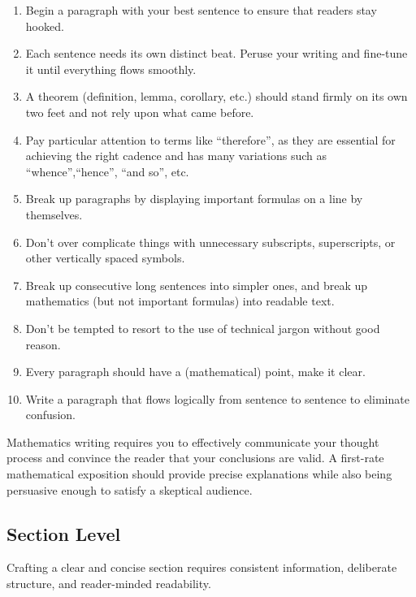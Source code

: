 \documentclass[
  twoside,
  12pt,
  letterpaper,
  fleqn]{article}
\providecommand{\tightlist}{%
  \setlength{\itemsep}{0pt}\setlength{\parskip}{0pt}}\usepackage{longtable,booktabs,array}
\begin{document}
\begin{enumerate}
\def\labelenumi{\arabic{enumi}.}
\tightlist
\item
  Begin a paragraph with your best sentence to ensure that readers stay
  hooked.
\item
  Each sentence needs its own distinct beat. Peruse your writing and
  fine-tune it until everything flows smoothly.
\item
  A theorem (definition, lemma, corollary, etc.) should stand firmly on
  its own two feet and not rely upon what came before.
\item
  Pay particular attention to terms like ``therefore'', as they are
  essential for achieving the right cadence and has many variations such
  as ``whence'',``hence'', ``and so'', etc.
\item
  Break up paragraphs by displaying important formulas on a line by
  themselves.
\item
  Don't over complicate things with unnecessary subscripts,
  superscripts, or other vertically spaced symbols.
\item
  Break up consecutive long sentences into simpler ones, and break up
  mathematics (but not important formulas) into readable text.
\item
  Don't be tempted to resort to the use of technical jargon without good
  reason.
\item
  Every paragraph should have a (mathematical) point, make it clear.
\item
  Write a paragraph that flows logically from sentence to sentence to
  eliminate confusion.
\end{enumerate}

Mathematics writing requires you to effectively communicate your thought
process and convince the reader that your conclusions are valid. A
first-rate mathematical exposition should provide precise explanations
while also being persuasive enough to satisfy a skeptical audience.

\hypertarget{section-level}{%
\subsection{Section Level}\label{section-level}}

Crafting a clear and concise section requires consistent information,
deliberate structure, and reader-minded readability.
\end{document}
